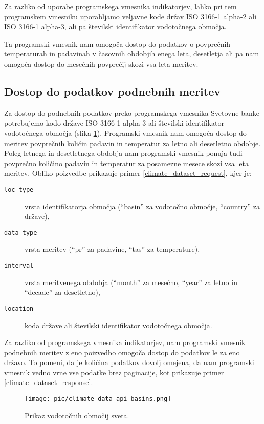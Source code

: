 Za razliko od uporabe programskega vmesnika indikatorjev, lahko pri tem
programskem vmesniku uporabljamo veljavne kode držav ISO 3166-1 alpha-2 ali ISO 3166-1 
alpha-3, ali pa številski identifikator vodotočnega 
območja.

Ta programski vmesnik nam omogoča dostop do podatkov o povprečnih 
temperaturah in padavinah v časovnih obdobjih enega leta, desetletja ali pa 
nam omogoča dostop do mesečnih povprečij skozi vsa leta meritev.


\subsection{Dostop do podatkov podnebnih meritev}

Za dostop do podnebnih podatkov preko programskega vmesnika Svetovne banke
potrebujemo kodo države ISO-3166-1 alpha-3 ali številski identifikator
vodotočnega območja (slika \ref{climate_data_api_basins}). Programski vmesnik
nam omogoča dostop do meritev povprečnih količin padavin in temperatur za 
letno ali desetletno obdobje. Poleg letnega in desetletnega obdobja nam 
programski vmesnik ponuja tudi povprečno količino padavin in temperatur za 
posamezne mesece skozi vsa leta meritev. Obliko poizvedbe prikazuje primer 
\ref{climate_dataset_request}, kjer je:
\begin{description}
\item [\tt loc\_type] vrsta identifikatorja območja (``basin'' za vodotočno območje, 
  ``country'' za države),
\item [\tt data\_type] vrsta meritev (``pr'' za padavine, ``tas'' za temperature),
\item [\tt interval] vrsta meritvenega obdobja (``month'' za mesečno, ``year'' za letno in
  ``decade'' za desetletno),
\item [\tt location] koda države ali številski identifikator vodotočnega območja.
\end{description}
Za razliko od programskega vmesnika indikatorjev, nam programski vmesnik
podnebnih meritev z eno poizvedbo omogoča dostop do podatkov le za eno državo.
To pomeni, da je količina podatkov dovolj omejena, da nam programski vmesnik
vedno vrne vse podatke brez paginacije, kot prikazuje primer 
\ref{climate_dataset_response}.


\begin{figure}
\begin{center}
\texttt{[image: pic/climate\_data\_api\_basins.png]}
\end{center}
\caption{Prikaz vodotočnih območij sveta.}
\label{climate_data_api_basins}
\end{figure} 


